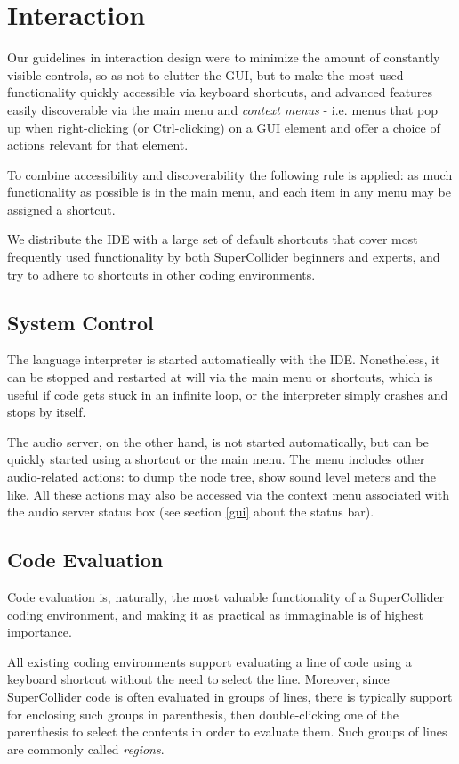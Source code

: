 \documentclass[11pt,a4paper]{article}
\begin{document}
\section{Interaction}

Our guidelines in interaction design were to minimize the amount of constantly visible controls, so as not to clutter
the GUI, but to make the most used functionality quickly accessible via keyboard shortcuts, and advanced features easily
discoverable via the main menu and \emph{context menus} - i.e. menus that pop up when right-clicking (or Ctrl-clicking)
on a GUI element and offer a choice of actions relevant for that element.

To combine accessibility and discoverability the following rule is applied: as much functionality as possible is
in the main menu, and each item in any menu may be assigned a shortcut.

We distribute the IDE with a large set of default shortcuts that cover most frequently used functionality by both
SuperCollider beginners and experts, and try to adhere to shortcuts in other coding environments.

\subsection{System Control}

The language interpreter is started automatically with the IDE. Nonetheless, it can be stopped and restarted at will
via the main menu or shortcuts, which is useful if code gets stuck in an infinite loop, or the interpreter simply
crashes and stops by itself.

The audio server, on the other hand, is not started automatically, but can be quickly started using a shortcut or the
main menu. The menu includes other audio-related actions: to dump the node tree, show sound level meters and the like.
All these actions may also be accessed via the context menu associated with the audio server status box (see section
\ref{gui} about the status bar).

\subsection{Code Evaluation}
\label{code-eval}

Code evaluation is, naturally, the most valuable functionality of a SuperCollider coding environment, and making it as
practical as immaginable is of highest importance.

All existing coding environments support evaluating a line of code using a keyboard shortcut without the need to select
the line. Moreover, since SuperCollider code is often evaluated in groups of lines, there is typically support for
enclosing such groups in parenthesis, then double-clicking one of the parenthesis to select the contents in order to
evaluate them. Such groups of lines are commonly called \emph{regions}.
\end{document}
